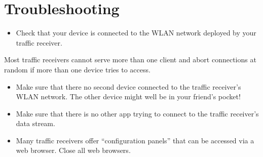 \documentclass[letterpaper,10pt,english]{sphinxmanual}
\begin{document}
\section{Troubleshooting}
\label{\detokenize{02-steps/traffic:troubleshooting}}
\sphinxAtStartPar
{}
\begin{itemize}
\item {} 
\sphinxAtStartPar
Check that your device is connected to the WLAN network deployed by your
traffic receiver.

\end{itemize}

\sphinxAtStartPar
{}

\sphinxAtStartPar
Most traffic receivers cannot serve more than one client and abort connections
at random if more than one device tries to access.
\begin{itemize}
\item {} 
\sphinxAtStartPar
Make sure that there no second device connected to the traffic receiver’s WLAN
network. The other device might well be in your friend’s pocket!

\item {} 
\sphinxAtStartPar
Make sure that there is no other app trying to connect to the traffic
receiver’s data stream.

\item {} 
\sphinxAtStartPar
Many traffic receivers offer “configuration panels” that can be accessed via a
web browser. Close all web browsers.

\end{itemize}
\end{document}
